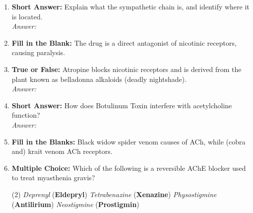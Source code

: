 \begin{enumerate}[label=\textbf{Q3.4.\arabic*}]
    \item \textbf{Short Answer:} Explain what the sympathetic chain is, and identify where it is located. \\
        \textit{Answer:} \\%

    \item \textbf{Fill in the Blank:} The drug \underline{\hspace{3cm}} is a direct antagonist of nicotinic receptors, causing paralysis.

    \item \textbf{True or False:} Atropine blocks nicotinic receptors and is derived from the plant known as belladonna alkaloids (deadly nightshade). \\
        \textit{Answer:} %

    \item \textbf{Short Answer:} How does Botulinum Toxin interfere with acetylcholine function? \\
        \textit{Answer:} \\%

    \item \textbf{Fill in the Blanks:} Black widow spider venom causes \underline{\hspace{3cm}} of ACh, while (cobra and) krait venom \underline{\hspace{3cm}} ACh receptors.

    \item \textbf{Multiple Choice:} Which of the following is a reversible AChE blocker used to treat myasthenia gravis?
        \begin{tasks}[label=\textcolor{\documentTheme}{(\Alph*)}, item-format=\color{\documentTheme}, label-width=1.5em, item-indent=1.7em](2)
            \task \textit{Deprenyl} (\textbf{Eldepryl})
            \task \textit{Tetrabenazine} (\textbf{Xenazine})
            \task \textit{Physostigmine} (\textbf{Antilirium})
            \task \textit{Neostigmine} (\textbf{Prostigmin})
        \end{tasks}


\end{enumerate}
